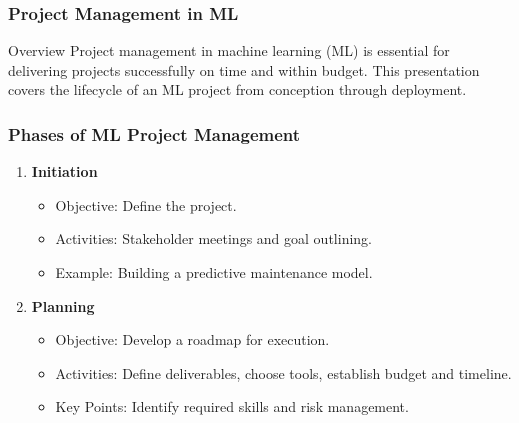 \documentclass[aspectratio=169]{beamer}
\begin{document}
\begin{frame}
    \frametitle{Project Management in ML}
    \begin{block}{Overview}
        Project management in machine learning (ML) is essential for delivering projects successfully on time and within budget. This presentation covers the lifecycle of an ML project from conception through deployment.
    \end{block}
\end{frame}

\begin{frame}
    \frametitle{Phases of ML Project Management}
    \begin{enumerate}
        \item \textbf{Initiation}
            \begin{itemize}
                \item Objective: Define the project.
                \item Activities: Stakeholder meetings and goal outlining.
                \item Example: Building a predictive maintenance model.
            \end{itemize}
            
        \item \textbf{Planning}
            \begin{itemize}
                \item Objective: Develop a roadmap for execution.
                \item Activities: Define deliverables, choose tools, establish budget and timeline.
                \item Key Points: Identify required skills and risk management.
            \end{itemize}
    \end{enumerate}
\end{frame}
\end{document}

